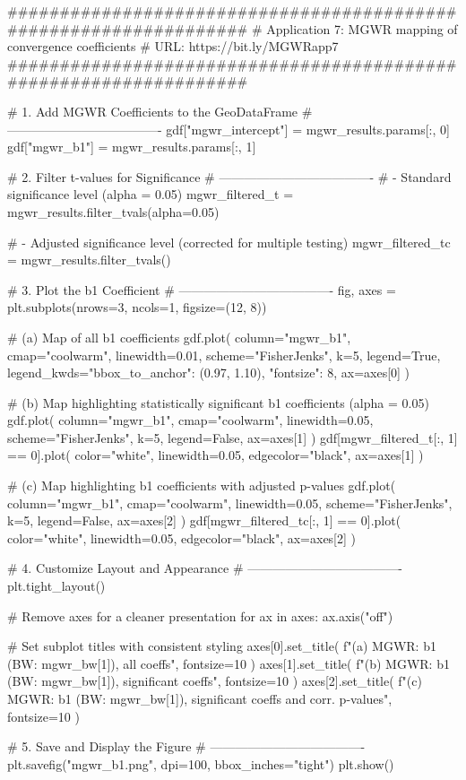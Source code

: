 \documentclass[smallextended, natbib]{svjour3}       %
\begin{document}
\begin{python}
##################################################################
# Application 7: MGWR mapping of convergence coefficients
# URL: https://bit.ly/MGWRapp7
##################################################################

# 1. Add MGWR Coefficients to the GeoDataFrame
# -------------------------------------
gdf["mgwr_intercept"] = mgwr_results.params[:, 0]
gdf["mgwr_b1"] = mgwr_results.params[:, 1]

# 2. Filter t-values for Significance
# -------------------------------------
# - Standard significance level (alpha = 0.05)
mgwr_filtered_t = mgwr_results.filter_tvals(alpha=0.05)

# - Adjusted significance level (corrected for multiple testing)
mgwr_filtered_tc = mgwr_results.filter_tvals()

# 3. Plot the b1 Coefficient
# -------------------------------------
fig, axes = plt.subplots(nrows=3, ncols=1, figsize=(12, 8))

# (a) Map of all b1 coefficients
gdf.plot(
    column="mgwr_b1",
    cmap="coolwarm",
    linewidth=0.01,
    scheme="FisherJenks",
    k=5,
    legend=True,
    legend_kwds={"bbox_to_anchor": (0.97, 1.10), "fontsize": 8},
    ax=axes[0]
)

# (b) Map highlighting statistically significant b1 coefficients (alpha = 0.05)
gdf.plot(
    column="mgwr_b1",
    cmap="coolwarm",
    linewidth=0.05,
    scheme="FisherJenks",
    k=5,
    legend=False,
    ax=axes[1]
)
gdf[mgwr_filtered_t[:, 1] == 0].plot(
    color="white",
    linewidth=0.05,
    edgecolor="black",
    ax=axes[1]
)

# (c) Map highlighting b1 coefficients with adjusted p-values
gdf.plot(
    column="mgwr_b1",
    cmap="coolwarm",
    linewidth=0.05,
    scheme="FisherJenks",
    k=5,
    legend=False,
    ax=axes[2]
)
gdf[mgwr_filtered_tc[:, 1] == 0].plot(
    color="white",
    linewidth=0.05,
    edgecolor="black",
    ax=axes[2]
)

# 4. Customize Layout and Appearance
# -------------------------------------
plt.tight_layout()

# Remove axes for a cleaner presentation
for ax in axes:
    ax.axis("off")

# Set subplot titles with consistent styling
axes[0].set_title(
    f"(a) MGWR: b1 (BW: {mgwr_bw[1]}), all coeffs", fontsize=10
)
axes[1].set_title(
    f"(b) MGWR: b1 (BW: {mgwr_bw[1]}), significant coeffs", fontsize=10
)
axes[2].set_title(
    f"(c) MGWR: b1 (BW: {mgwr_bw[1]}), significant coeffs and corr. p-values",
    fontsize=10
)

# 5. Save and Display the Figure
# -------------------------------------
plt.savefig("mgwr_b1.png", dpi=100, bbox_inches="tight")
plt.show()
\end{python}
\end{document}
